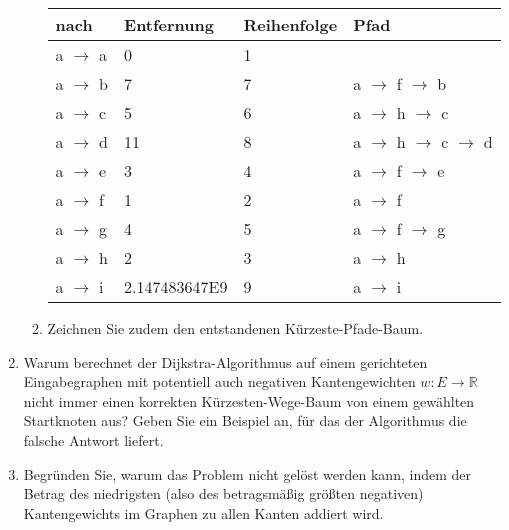 \documentclass{bschlangaul-aufgabe}
\begin{document}
\begin{enumerate}
\begin{enumerate}
\begin{bAntwort}
\begin{tabular}{llll}
\bf{nach} & \bf{Entfernung} & \bf{Reihenfolge} & \bf{Pfad} \\
\hline
a  $\rightarrow$  a & 0 & 1 &   \\
a  $\rightarrow$  b & 7 & 7 & a $\rightarrow$ f $\rightarrow$ b \\
a  $\rightarrow$  c & 5 & 6 & a $\rightarrow$ h $\rightarrow$ c \\
a  $\rightarrow$  d & 11 & 8 & a $\rightarrow$ h $\rightarrow$ c $\rightarrow$ d \\
a  $\rightarrow$  e & 3 & 4 & a $\rightarrow$ f $\rightarrow$ e \\
a  $\rightarrow$  f & 1 & 2 & a $\rightarrow$ f \\
a  $\rightarrow$  g & 4 & 5 & a $\rightarrow$ f $\rightarrow$ g \\
a  $\rightarrow$  h & 2 & 3 & a $\rightarrow$ h \\
a  $\rightarrow$  i & 2.147483647E9 & 9 & a $\rightarrow$ i \\
\end{tabular}
\end{bAntwort}


\item Zeichnen Sie zudem den entstandenen Kürzeste-Pfade-Baum.

\end{enumerate}


\item Warum berechnet der Dijkstra-Algorithmus auf einem gerichteten
Eingabegraphen mit potentiell auch negativen Kantengewichten $w : E
\rightarrow \mathbb{R}$ nicht immer einen korrekten Kürzesten-Wege-Baum
von einem gewählten Startknoten aus? Geben Sie ein Beispiel an, für das
der Algorithmus die falsche Antwort liefert.


\item Begründen Sie, warum das Problem nicht gelöst werden kann, indem
der Betrag des niedrigsten (also des betragsmäßig größten negativen)
Kantengewichts im Graphen zu allen Kanten addiert wird.

\end{enumerate}
\end{document}
